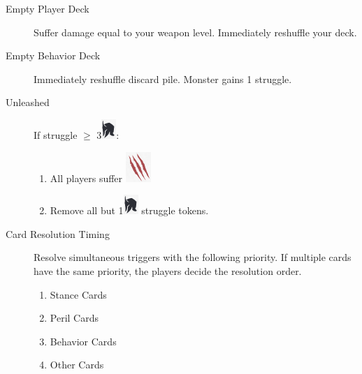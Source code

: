 \documentclass[12pt]{article}
\newenvironment{enumerateCustom}
{\begin{enumerate}
  \setlength{\itemsep}{1pt}
  \setlength{\parskip}{0pt}
  \setlength{\parsep}{0pt}}
{\end{enumerate}}
\begin{document}
\pagebreak

\begin{mdframed}[style=SummaryCard, align=center, userdefinedwidth=35em, frametitle={Important Triggers and Resolutions}]


    \begin{description}
        \item[Empty Player Deck] Suffer damage equal to your weapon level. Immediately reshuffle your deck.
        \item[Empty Behavior Deck] Immediately reshuffle discard pile. Monster gains 1 struggle.
        \item[Unleashed] If struggle $\ge$ 3\includegraphics[scale=0.40]{images/per_player.png}:
            \begin{enumerateCustom}
                \item All players suffer \includegraphics[scale=0.30]{images/monster_damage.png}
                \item Remove all but 1\includegraphics[scale=0.40]{images/per_player.png} struggle tokens.
            \end{enumerateCustom}
        \item[Card Resolution Timing] Resolve simultaneous triggers with the following priority. If multiple cards have the same priority, the players decide the resolution order.
            \begin{enumerateCustom}
                \item Stance Cards
                \item Peril Cards
                \item Behavior Cards
                \item Other Cards
            \end{enumerateCustom}
    \end{description}

\end{mdframed}
\end{document}
